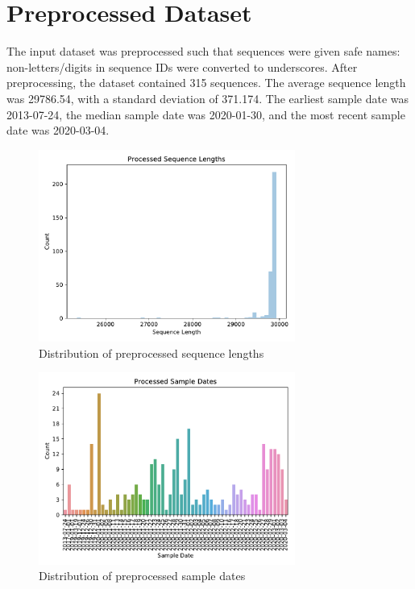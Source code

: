 \documentclass{article}
\begin{document}
\section{Preprocessed Dataset}
The input dataset was preprocessed such that sequences were given safe names: non-letters/digits in sequence IDs were converted to underscores.
After preprocessing, the dataset contained 315 sequences.
The average sequence length was 29786.54,
with a standard deviation of 371.174.
The earliest sample date was 2013-07-24,
the median sample date was 2020-01-30,
and the most recent sample date was 2020-03-04.


\begin{figure}[h]
\centering
\includegraphics[width=0.75\textwidth,keepaspectratio]{./figs/processed_sequence_lengths.pdf}
\caption{Distribution of preprocessed sequence lengths}
\end{figure}



\begin{figure}[h]
\centering
\includegraphics[width=0.75\textwidth,keepaspectratio]{./figs/processed_sample_dates.pdf}
\caption{Distribution of preprocessed sample dates}
\end{figure}
\end{document}
